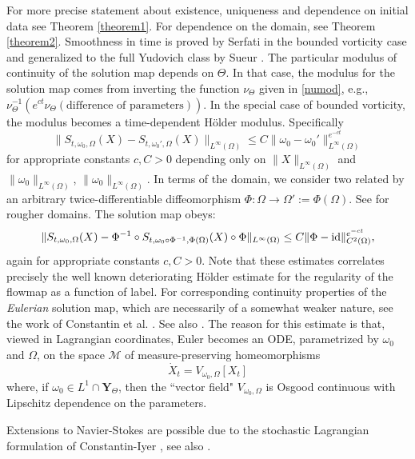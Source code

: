 \documentclass[12pt]{article}
\begin{document}
For more precise statement about existence, uniqueness and dependence on initial data see Theorem \ref{theorem1}. For dependence on the domain, see Theorem \ref{theorem2}.   Smoothness in time is proved by Serfati \cite{Serfati} in the bounded vorticity case and generalized to the full Yudovich class by Sueur \cite{Sueur}. The particular modulus of continuity of the solution map depends on $\Theta$.  In that case, the  modulus for the solution map comes from inverting the function $\nu_\Theta$ given in  \eqref{numod}, e.g., $\nu_\Theta^{-1}( e^{ct} \nu_\Theta(\text{difference of parameters}))$.  In the special case of bounded vorticity, the modulus becomes 
a time-dependent H\"{o}lder modulus. Specifically
\begin{equation}
\|S_{t,\omega_0, \Omega}(X) - S_{t,\omega_0', \Omega}(X)\|_{L^\infty(\Omega)} \leq C  \|\omega_0-\omega_0'\|_{L^\infty(\Omega)}^{e^{-c t}}
\end{equation}
for appropriate constants $c,C>0$ depending only on $\|X\|_{L^\infty(\Omega)}$ and $\|\omega_0\|_{L^\infty(\Omega)}$, $\|\omega_0\|_{L^\infty(\Omega)}$.   In terms of the domain, we consider two related by an arbitrary twice-differentiable diffeomorphism $\Phi: \Omega\to \Omega' := \Phi(\Omega)$.  See \cite{L15,LZ19} for rougher domains. The solution map obeys:
\begin{equation}
\|S_{t,\omega_0, \Omega}(X) -  \Phi^{-1}\circ S_{t,\omega_0\circ \Phi^{-1}, \Phi(\Omega)}(X)\circ \Phi\|_{L^\infty(\Omega)} \leq C  \|\Phi - {\rm id}\|_{C^2(\Omega)}^{e^{-c t}},
\end{equation}
again for appropriate constants $c,C>0$. 
Note that these estimates correlates  precisely the well known deteriorating H\"older estimate for the regularity of the flowmap as a function of label.  For corresponding continuity properties of the \emph{Eulerian} solution map,  which are necessarily of a somewhat weaker nature, see the work of Constantin et al. \cite{CDE}.  See also  \cite{CW}. The reason for this estimate is that, viewed in Lagrangian coordinates, Euler becomes an ODE, parametrized by $\omega_0$ and $\Omega$, on the space $\mathcal{M}$ of measure-preserving homeomorphisms 
\begin{equation}
\dot{X}_t = V_{\omega_0,\Omega}[X_t]
\end{equation}
where, if $\omega_0\in L^1\cap\mathbf{Y}_{\Theta}$, then the ``vector field" $V_{\omega_0,\Omega}$ is Osgood continuous with Lipschitz dependence on the parameters. 


Extensions to Navier-Stokes are possible due to the stochastic Lagrangian formulation of Constantin-Iyer \cite{CI}, see also \cite{CDE, CCS24}.
\end{document}
